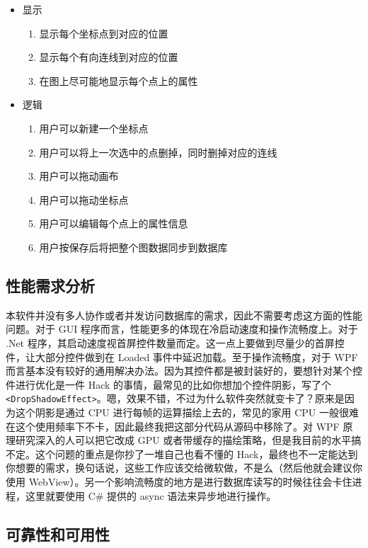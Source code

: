 \begin{itemize}
  \item 显示
  \begin{enumerate}
    \item 显示每个坐标点到对应的位置
    \item 显示每个有向连线到对应的位置
    \item 在图上尽可能地显示每个点上的属性
  \end{enumerate}
  \item 逻辑
  \begin{enumerate}
    \item 用户可以新建一个坐标点
    \item 用户可以将上一次选中的点删掉，同时删掉对应的连线
    \item 用户可以拖动画布
    \item 用户可以拖动坐标点
    \item 用户可以编辑每个点上的属性信息
    \item 用户按保存后将把整个图数据同步到数据库
  \end{enumerate}
\end{itemize}

\subsection{性能需求分析}

本软件并没有多人协作或者并发访问数据库的需求，因此不需要考虑这方面的性能问题。对于 GUI 程序而言，性能更多的体现在冷启动速度和操作流畅度上。对于 .Net 程序，其启动速度视首屏控件数量而定。这一点上要做到尽量少的首屏控件，让大部分控件做到在 Loaded 事件中延迟加载。至于操作流畅度，对于 WPF 而言基本没有较好的通用解决办法。因为其控件都是被封装好的，要想针对某个控件进行优化是一件 Hack 的事情，最常见的比如你想加个控件阴影，写了个 \texttt{<DropShadowEffect>}。嗯，效果不错，不过为什么软件突然就变卡了？原来是因为这个阴影是通过 CPU 进行每帧的运算描绘上去的，常见的家用 CPU 一般很难在这个使用频率下不卡，因此最终我把这部分代码从源码中移除了。对 WPF 原理研究深入的人可以把它改成 GPU 或者带缓存的描绘策略，但是我目前的水平搞不定。这个问题的重点是你抄了一堆自己也看不懂的 Hack，最终也不一定能达到你想要的需求，换句话说，这些工作应该交给微软做，不是么（然后他就会建议你使用 WebView）。另一个影响流畅度的地方是进行数据库读写的时候往往会卡住进程，这里就要使用 C\# 提供的 async 语法来异步地进行操作。

\subsection{可靠性和可用性}

